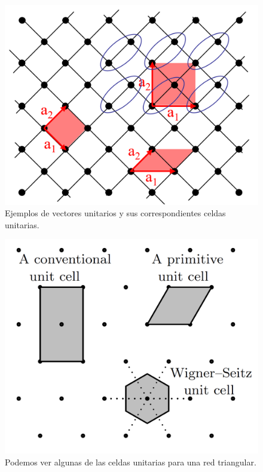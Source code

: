 \begin{figure}[h!] \centering
    \includegraphics[scale=0.55]{Cuerpo/Ch_01/celda.png}
    \caption{Ejemplos de vectores unitarios y sus correspondientes celdas unitarias.}
    \label{Fig:01-01}
\end{figure}

\begin{figure}[h!] \centering
\includegraphics[scale=0.4]{Cuerpo/Ch_01/Celdas.png}
\caption{Podemos ver algunas de las celdas unitarias para una red triangular.}
\label{Fig:01-011}
\end{figure}

